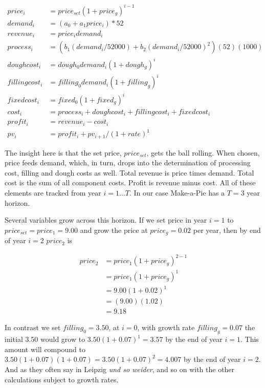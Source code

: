 \documentclass[
]{book}
\begin{document}
\[
\begin{align}
price_i       &= price_{set}  (1 + price_g) ^ {i - 1} \\
demand_i      &= (a_0 + a_1  price_i) * 52 \\
revenue_i     &= price_i  demand_i \\
process_i     &= (b_1  (demand_i / 52000) + b_2  (demand_i / 52000) ^ 2) (52)(1000) \\ 
doughcost_i   &= dough_0 demand_i  (1 + dough_g) ^ i \\
fillingcost_i &= filling_0  demand_i  (1 + filling_g) ^ i \\
fixedcost_i   &= fixed_0  (1 + fixed_g) ^ i \\
cost_i        &= process_i + doughcost_i + fillingcost_i + fixedcost_i \\
profit_i      &= revenue_i - cost_i \\
pv_i          &= profit_i + pv_{i+1} / (1 + rate) ^ 1
\end{align}
\]

The insight here is that the set price, \(price_{set}\), gets the ball rolling. When chosen, price feeds demand, which, in turn, drops into the determination of processing cost, filling and dough costs as well. Total revenue is price times demand. Total cost is the sum of all component costs. Profit is revenue minus cost. All of these elements are tracked from year \(i= 1 \ldots T\). In our case Make-a-Pie has a \(T=3\) year horizon.

Several variables grow across this horizon. If we set price in year \(i = 1\) to \(price_{set}= price_1 = 9.00\) and grow the price at \(price_g = 0.02\) per year, then by end of year \(i=2\) \(price_2\) is

\[
\begin{align}
price_2 &= price_1 (1+price_g)^{2-1} \\ 
        &= price_1 (1+price_g)^{1}   \\
        &= 9.00 (1 + 0.02)^1 \\
        &= (9.00)(1.02) \\
        &= 9.18
\end{align}
\]

In contrast we set \(filling_0 = 3.50\), at \(i = 0\), with growth rate \(filling_g = 0.07\) the initial 3.50 would grow to \(3.50(1+0.07)^1 = 3.57\) by the end of year \(i=1\). This amount will compound to \(3.50(1+0.07)(1+0.07) = 3.50(1+0.07)^2 = 4.007\) by the end of year \(i=2\). And as they often say in Leipzig \emph{und so weider}, and so on with the other calculations subject to growth rates.
\end{document}

